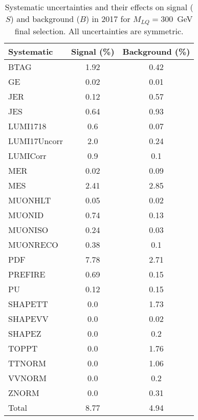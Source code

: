 \begin{table}[htbp]
\begin{center}
\caption{Systematic uncertainties and their effects on signal ($S$) and background ($B$) in 2017 for $M_{LQ}=300$~GeV final selection. All uncertainties are symmetric.}
\begin{tabular}{lcc}
\hline\hline
Systematic & Signal (\%) & Background (\%) \\ \hline 
BTAG & 1.92 & 0.42\\ 
GE & 0.02 & 0.01\\ 
JER & 0.12 & 0.57\\ 
JES & 0.64 & 0.93\\ 
LUMI1718 & 0.6 & 0.07\\ 
LUMI17Uncorr & 2.0 & 0.24\\ 
LUMICorr & 0.9 & 0.1\\ 
MER & 0.02 & 0.09\\ 
MES & 2.41 & 2.85\\ 
MUONHLT & 0.05 & 0.02\\ 
MUONID & 0.74 & 0.13\\ 
MUONISO & 0.24 & 0.03\\ 
MUONRECO & 0.38 & 0.1\\ 
PDF & 7.78 & 2.71\\ 
PREFIRE & 0.69 & 0.15\\ 
PU & 0.12 & 0.15\\ 
SHAPETT & 0.0 & 1.73\\ 
SHAPEVV & 0.0 & 0.02\\ 
SHAPEZ & 0.0 & 0.2\\ 
TOPPT & 0.0 & 1.76\\ 
TTNORM & 0.0 & 1.06\\ 
VVNORM & 0.0 & 0.2\\ 
ZNORM & 0.0 & 0.31\\ 
Total & 8.77 & 4.94\\ \hline \hline
\end{tabular}
\label{tab:SysUncertainties_uujj_300}
\end{center}
\end{table}


